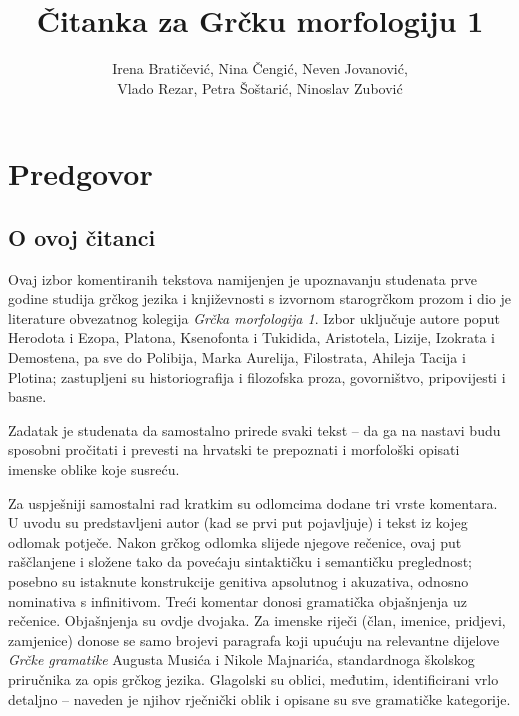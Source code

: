 \documentclass[a4paper,12pt,twoside]{report}
\begin{document}
\title{Čitanka za Grčku morfologiju 1}

\author{Irena Bratičević, Nina Čengić, Neven Jovanović,\\Vlado Rezar, Petra Šoštarić, Ninoslav Zubović}
\date{}


\clearpage

\tableofcontents

\thispagestyle{empty}




\chapter*{Predgovor}
\label{chap:predgovor}

\section*{O ovoj čitanci}

Ovaj izbor komentiranih tekstova namijenjen je upoznavanju studenata prve godine studija grčkog jezika i književnosti s izvornom starogrčkom prozom i dio je literature obvezatnog kolegija \textit{Grčka morfologija 1}. Izbor uključuje autore poput Herodota i Ezopa, Platona, Ksenofonta i Tukidida, Aristotela, Lizije, Izokrata i Demostena, pa sve do Polibija, Marka Aurelija, Filostrata, Ahileja Tacija i Plotina; zastupljeni su historiografija i filozofska proza, govorništvo, pripovijesti i basne.

Zadatak je studenata da samostalno prirede svaki tekst – da ga na nastavi budu sposobni pročitati i prevesti na hrvatski te prepoznati i morfološki opisati imenske oblike koje susreću.

Za uspješniji samostalni rad kratkim su odlomcima dodane tri vrste komentara. U uvodu su predstavljeni autor (kad se prvi put pojavljuje) i tekst iz kojeg odlomak potječe. Nakon grčkog odlomka slijede njegove rečenice, ovaj put raščlanjene i složene tako da povećaju sintaktičku i semantičku preglednost; posebno su istaknute konstrukcije genitiva apsolutnog i akuzativa, odnosno nominativa s infinitivom. Treći komentar donosi gramatička objašnjenja uz rečenice. Objašnjenja su ovdje dvojaka. Za imenske riječi (član, imenice, pridjevi, zamjenice) donose se samo brojevi paragrafa koji upućuju na relevantne dijelove \textit{Grčke gramatike} Augusta Musića i Nikole Majnarića, standardnoga školskog priručnika za opis grčkog jezika. Glagolski su oblici, međutim, identificirani vrlo detaljno – naveden je njihov rječnički oblik i opisane su sve gramatičke kategorije. 
\end{document}

